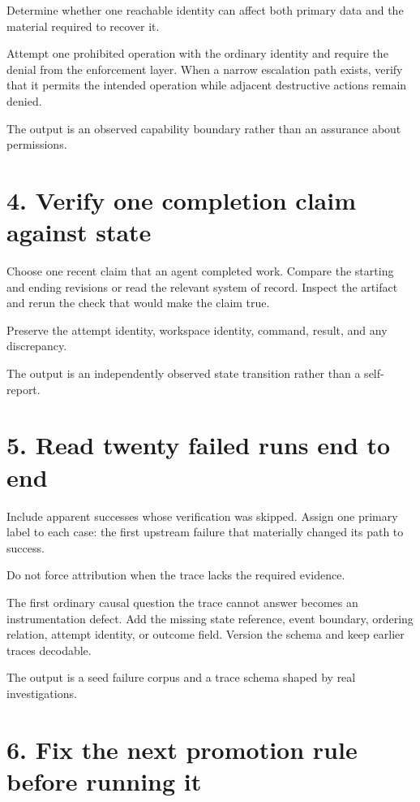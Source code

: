 Determine whether one reachable identity can affect both primary data and the material required to recover it.

Attempt one prohibited operation with the ordinary identity and require the denial from the enforcement layer. When a narrow escalation path exists, verify that it permits the intended operation while adjacent destructive actions remain denied.

The output is an observed capability boundary rather than an assurance about permissions.

\section{4. Verify one completion claim against state}\label{verify-one-completion-claim-against-state}

Choose one recent claim that an agent completed work. Compare the starting and ending revisions or read the relevant system of record. Inspect the artifact and rerun the check that would make the claim true.

Preserve the attempt identity, workspace identity, command, result, and any discrepancy.

The output is an independently observed state transition rather than a self-report.

\section{5. Read twenty failed runs end to end}\label{read-twenty-failed-runs-end-to-end}

Include apparent successes whose verification was skipped. Assign one primary label to each case: the first upstream failure that materially changed its path to success.

Do not force attribution when the trace lacks the required evidence.

The first ordinary causal question the trace cannot answer becomes an instrumentation defect. Add the missing state reference, event boundary, ordering relation, attempt identity, or outcome field. Version the schema and keep earlier traces decodable.

The output is a seed failure corpus and a trace schema shaped by real investigations.

\section{6. Fix the next promotion rule before running it}\label{fix-the-next-promotion-rule-before-running-it}

